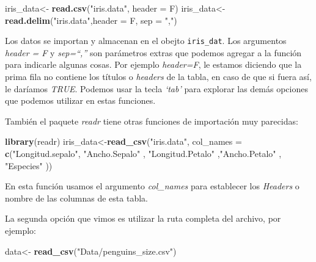 \documentclass[
]{book}
\newenvironment{Shaded}{\begin{snugshade}}{\end{snugshade}}
\newcommand{\AttributeTok}[1]{\textcolor[rgb]{0.13,0.29,0.53}{#1}}
\newcommand{\FunctionTok}[1]{\textcolor[rgb]{0.13,0.29,0.53}{\textbf{#1}}}
\newcommand{\NormalTok}[1]{#1}
\newcommand{\OtherTok}[1]{\textcolor[rgb]{0.56,0.35,0.01}{#1}}
\newcommand{\StringTok}[1]{\textcolor[rgb]{0.31,0.60,0.02}{#1}}
\begin{document}
\begin{Shaded}
\begin{Highlighting}[]
\NormalTok{iris\_data}\OtherTok{\textless{}{-}} \FunctionTok{read.csv}\NormalTok{(}\StringTok{"iris.data"}\NormalTok{, }\AttributeTok{header =}\NormalTok{ F)}
\NormalTok{iris\_data}\OtherTok{\textless{}{-}} \FunctionTok{read.delim}\NormalTok{(}\StringTok{"iris.data"}\NormalTok{,}\AttributeTok{header =}\NormalTok{ F, }\AttributeTok{sep =} \StringTok{","}\NormalTok{)}
\end{Highlighting}
\end{Shaded}

Los datos se importan y almacenan en el obejto \texttt{iris\_dat}.
Los argumentos \emph{header = F} y \emph{sep=``,''} son parámetros extras que podemos agregar a la función para indicarle algunas cosas.
Por ejemplo \emph{header=F}, le estamos diciendo que la prima fila no contiene los títulos o \emph{headers} de la tabla, en caso de que si fuera así, le daríamos \emph{TRUE}.
Podemos usar la tecla \emph{`tab'} para explorar las demás opciones que podemos utilizar en estas funciones.

También el paquete \emph{readr} tiene otras funciones de importación muy parecidas:

\begin{Shaded}
\begin{Highlighting}[]
\FunctionTok{library}\NormalTok{(readr)}
\NormalTok{iris\_data}\OtherTok{\textless{}{-}}\FunctionTok{read\_csv}\NormalTok{(}\StringTok{"iris.data"}\NormalTok{, }\AttributeTok{col\_names =} \FunctionTok{c}\NormalTok{(}\StringTok{"Longitud.sepalo"}\NormalTok{, }\StringTok{"Ancho.Sepalo"}\NormalTok{ ,}
                                               \StringTok{"Longitud.Petalo"}\NormalTok{ ,}\StringTok{"Ancho.Petalo"}\NormalTok{ , }\StringTok{"Especies"}\NormalTok{  ))}
\end{Highlighting}
\end{Shaded}

En esta función usamos el argumento \emph{col\_names} para establecer los \emph{Headers} o nombre de las columnas de esta tabla.

La segunda opción que vimos es utilizar la ruta completa del archivo, por ejemplo:

\begin{Shaded}
\begin{Highlighting}[]
\NormalTok{data}\OtherTok{\textless{}{-}} \FunctionTok{read\_csv}\NormalTok{(}\StringTok{"Data/penguins\_size.csv"}\NormalTok{)}
\end{Highlighting}
\end{Shaded}
\end{document}
